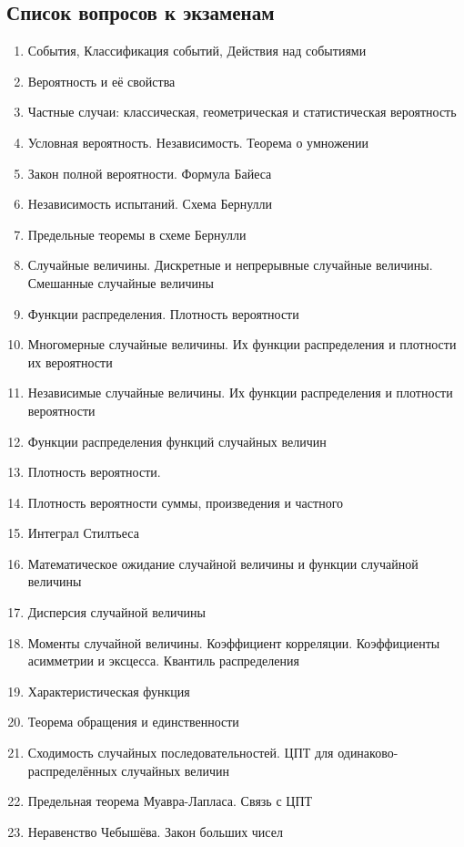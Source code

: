 \subsection{Список вопросов к
экзаменам}\label{ux441ux43fux438ux441ux43eux43a-ux432ux43eux43fux440ux43eux441ux43eux432-ux43a-ux44dux43aux437ux430ux43cux435ux43dux430ux43c}

\begin{enumerate}
\def\labelenumi{\arabic{enumi}.}

\item
  События, Классификация событий, Действия над событиями
\item
  Вероятность и её свойства
\item
  Частные случаи: классическая, геометрическая и статистическая
  вероятность
\item
  Условная вероятность. Независимость. Теорема о умножении
\item
  Закон полной вероятности. Формула Байеса
\item
  Независимость испытаний. Схема Бернулли
\item
  Предельные теоремы в схеме Бернулли
\item
  Случайные величины. Дискретные и непрерывные случайные величины.
  Смешанные случайные величины
\item
  Функции распределения. Плотность вероятности
\item
  Многомерные случайные величины. Их функции распределения и плотности
  их вероятности
\item
  Независимые случайные величины. Их функции распределения и плотности
  вероятности
\item
  Функции распределения функций случайных величин
\item
  Плотность вероятности.
\item
  Плотность вероятности суммы, произведения и частного
\item
  Интеграл Стилтьеса
\item
  Математическое ожидание случайной величины и функции случайной
  величины
\item
  Дисперсия случайной величины
\item
  Моменты случайной величины. Коэффициент корреляции. Коэффициенты
  асимметрии и эксцесса. Квантиль распределения
\item
  Характеристическая функция
\item
  Теорема обращения и единственности
\item
  Сходимость случайных последовательностей. ЦПТ для
  одинаково-распределённых случайных величин
\item
  Предельная теорема Муавра-Лапласа. Связь с ЦПТ
\item
  Неравенство Чебышёва. Закон больших чисел
\end{enumerate}
